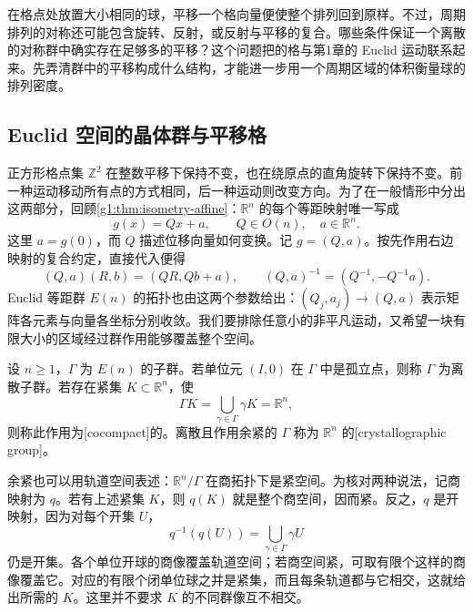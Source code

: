 在格点处放置大小相同的球，平移一个格向量便使整个排列回到原样。不过，周期排列的对称还可能包含旋转、反射，或反射与平移的复合。哪些条件保证一个离散的对称群中确实存在足够多的平移？这个问题把的格与第1章的 Euclid 运动联系起来。先弄清群中的平移构成什么结构，才能进一步用一个周期区域的体积衡量球的排列密度。

\subsection{Euclid 空间的晶体群与平移格}
\label{g1:subsec:B04:01}

正方形格点集 \(\mathbb Z^2\) 在整数平移下保持不变，也在绕原点的直角旋转下保持不变。前一种运动移动所有点的方式相同，后一种运动则改变方向。为了在一般情形中分出这两部分，回顾\cref{g1:thm:isometry-affine}：\(\mathbb R^n\) 的每个等距映射唯一写成
\[
	g(x)=Qx+a,\qquad Q\in O(n),\quad a\in\mathbb R^n.
\]
这里 \(a=g(0)\)，而 \(Q\) 描述位移向量如何变换。记 \(g=(Q,a)\)。按先作用右边映射的复合约定，直接代入便得
\begin{equation}\label{g1:eq:crystallographic-group-law}
	(Q,a)(R,b)=(QR,Qb+a),\qquad
	(Q,a)^{-1}=(Q^{-1},-Q^{-1}a).
\end{equation}
Euclid 等距群 \(E(n)\) 的拓扑也由这两个参数给出：\((Q_j,a_j)\to(Q,a)\) 表示矩阵各元素与向量各坐标分别收敛。我们要排除任意小的非平凡运动，又希望一块有限大小的区域经过群作用能够覆盖整个空间。

\begin{definition}[晶体群]
	\label{g1:def:crystallographic-group}
	设 \(n\ge1\)，\(\Gamma\) 为 \(E(n)\) 的子群。若单位元 \((I,0)\) 在 \(\Gamma\) 中是孤立点，则称 \(\Gamma\) 为离散子群。若存在紧集 \(K\subset\mathbb R^n\)，使
	\[
		\Gamma K=\bigcup_{\gamma\in\Gamma}\gamma K=\mathbb R^n,
	\]
	则称此作用为[cocompact]的。离散且作用余紧的 \(\Gamma\) 称为 \(\mathbb R^n\) 的[crystallographic group]。
\end{definition}

余紧也可以用轨道空间表述：\(\mathbb R^n/\Gamma\) 在商拓扑下是紧空间。为核对两种说法，记商映射为 \(q\)。若有上述紧集 \(K\)，则 \(q(K)\) 就是整个商空间，因而紧。反之，\(q\) 是开映射，因为对每个开集 \(U\)，
\[
	q^{-1}(q(U))=\bigcup_{\gamma\in\Gamma}\gamma U
\]
仍是开集。各个单位开球的商像覆盖轨道空间；若商空间紧，可取有限个这样的商像覆盖它。对应的有限个闭单位球之并是紧集，而且每条轨道都与它相交，这就给出所需的 \(K\)。这里并不要求 \(K\) 的不同群像互不相交。

\ProseParagraphBreak

